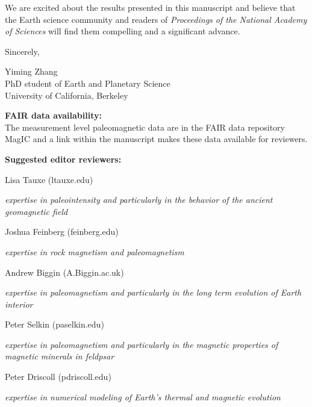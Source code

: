 \documentclass[11pt, letterpaper]{article}
\begin{document}
\begin{flushleft}
We are excited about the results presented in this manuscript and believe that the Earth science community and readers of \textit{Proceedings of the National Academy of Sciences} will find them compelling and a significant advance.



Sincerely,

Yiming Zhang\\

PhD student of Earth and Planetary Science\\

University of California, Berkeley

\clearpage

\textbf{FAIR data availability:}\\
The measurement level paleomagnetic data are in the FAIR data repository MagIC and a link within the manuscript makes these data available for reviewers.

\textbf{Suggested editor reviewers:}\

Lisa Tauxe (ltauxe\@ucsd.edu)\

\textit{expertise in paleointensity and particularly in the behavior of the ancient geomagnetic field}

Joshua Feinberg (feinberg\@umn.edu)\

\textit{expertise in rock magnetism and paleomagnetism}

Andrew Biggin (A.Biggin\@liverpool.ac.uk)\

\textit{expertise in paleomagnetism and particularly in the long term evolution of Earth interior}

Peter Selkin (paselkin\@uw.edu)\

\textit{expertise in paleomagnetism and particularly in the  magnetic properties of magnetic minerals in feldpsar}

Peter Driscoll (pdriscoll\@carnegiescience.edu)\

\textit{expertise in numerical modeling of Earth's thermal and magnetic evolution}
\textit{}
\end{flushleft}
\end{document}
